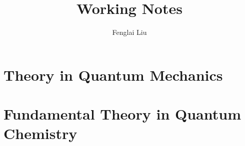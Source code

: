 \documentclass[a4paper,12pt,oneside]{book}
\author{Fenglai Liu}
\title{Working Notes}
\theoremstyle{definition}\newtheorem{law}{Law}
\theoremstyle{plain}\newtheorem{theorem}{Theorem}
\theoremstyle{remark}\newtheorem{remark}{Remark}
\theoremstyle{axiom}\newtheorem{axiom}{Axiom}
\numberwithin{law}{chapter}
\numberwithin{theorem}{chapter}
\numberwithin{remark}{chapter}
\begin{document}
\maketitle
\tableofcontents


\graphicspath{{figure/}}




\part{Theory in Quantum Mechanics}
%
%
%
%
%
%
%
%
%
%
%
%
%
%
%

\part{Fundamental Theory in Quantum Chemistry}
%
%
%

%
%
%
%
%
%
%
%
%


%
%
%
\end{document}
